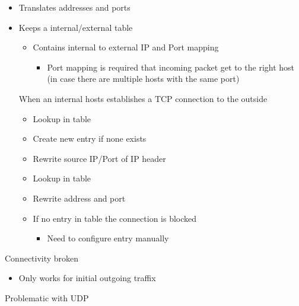 \begin{itemize}
\begin{itemize}
            \item Translates addresses and ports
        \end{itemize}
        \begin{itemize}
            \item Keeps a internal/external table
                \begin{itemize}
                    \item Contains internal to external IP and Port mapping
                        \begin{itemize}
                            \item Port mapping is required that incoming packet get to the right host (in case there are multiple hosts with the same port)
                        \end{itemize}
                \end{itemize}
             When an internal hosts establishes a TCP connection to the outside
                \begin{itemize}
                    \item Lookup in table
                    \item Create new entry if none exists
                    \item Rewrite source IP/Port of IP header
                \end{itemize}
                \begin{itemize}
                    \item Lookup in table
                    \item Rewrite address and port
                    \item If no entry in table the connection is blocked
                        \begin{itemize}
                            \item Need to configure entry manually
                        \end{itemize}
                \end{itemize}
        \end{itemize}
    \icon Connectivity broken
        \begin{itemize}
            \item Only works for initial outgoing traffix
        \end{itemize}
    \icon Problematic with UDP
        \begin{itemize}

\end{itemize}
\end{itemize}
